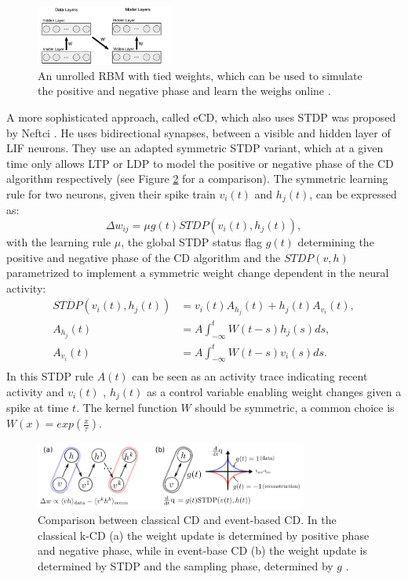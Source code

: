 \begin{figure}
	\centering
    	\includegraphics[width=0.4\textwidth]{imgs/evtCD.png} 
    \caption[An unrolled RBM with tied weights for CD.]{An unrolled RBM with tied weights, which can be used to simulate the positive and negative phase and learn the weighs online \cite{Neil2013}.}
	\label{fig:evtCD}
\end{figure}

A more sophisticated approach, called eCD, which also uses STDP was proposed by Neftci \cite{Neftci2013}.
He uses bidirectional synapses, between a visible and hidden layer of LIF neurons.
They use an adapted symmetric STDP variant, which at a given time only allows LTP or LDP to model the positive or negative phase of the CD algorithm respectively (see Figure \ref{fig:ecdcomp} for a comparison). 
The symmetric learning rule for two neurons, given their spike train $v_i(t)$ and $h_j(t)$, can be expressed as:
\[
\Delta w_{ij} = \mu g(t) STDP(v_i(t), h_j(t)),
\]
with the learning rule $\mu$, the global STDP status flag $g(t)$ determining the positive and negative phase of the CD algorithm and the $STDP(v, h)$ parametrized to implement a symmetric weight change dependent in the neural activity:
\[
\begin{split}
STDP(v_i(t), h_j(t)) &= v_i(t) A_{h_j}(t) + h_j(t) A_{v_i}(t), \\
A_{h_j}(t) &= A \int_{- \infty}^t W(t-s) h_j(s) ds, \\ 
A_{v_i}(t) &= A \int_{- \infty}^t W(t-s) v_i(s) ds. \\ 
\end{split}
\]
In this STDP rule $A(t)$ can be seen as an activity trace indicating recent activity and $v_i(t)$ , $h_j(t)$ as a control variable enabling weight changes given a spike at time $t$.    
The kernel function $W$ should be symmetric, a common choice is $W(x) = exp(\frac{x}{\tau})$. 

\begin{figure}
	\centering
    	\includegraphics[width=0.8\textwidth]{imgs/eCD2.png} 
    \caption[Comparison between classical CD and event-based CD.]{Comparison between classical CD and event-based CD. In the classical k-CD (a) the weight update is determined by positive phase and negative phase, while in event-base CD (b) the weight update is determined by STDP and the sampling phase, determined by $g$ \cite{Neftci2013}.}
	\label{fig:ecdcomp}
\end{figure}
  
